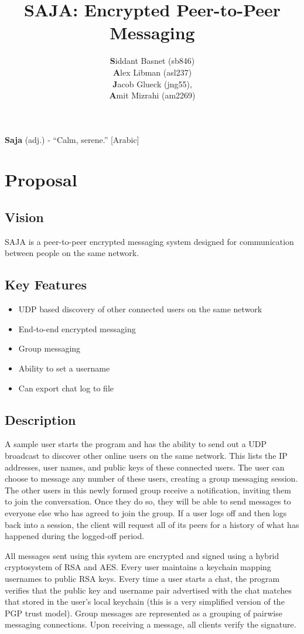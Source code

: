 \documentclass{scrartcl}
\title{SAJA: Encrypted Peer-to-Peer Messaging}
\author{\textbf{S}iddant Basnet (sb846) \\ \textbf{A}lex Libman (asl237)\\ \textbf{J}acob Glueck (jng55), \\ \textbf{A}mit Mizrahi (am2269)}
\date{}
\begin{document}
\maketitle

\textbf{Saja} (adj.) - ``Calm, serene.'' [Arabic]

\section{Proposal}
\subsection{Vision}
SAJA is a peer-to-peer encrypted messaging system designed for communication between people on the same network.

\subsection{Key Features}
\begin{itemize}
	\item UDP based discovery of other connected users on the same network
	\item End-to-end encrypted messaging
	\item Group messaging
	\item Ability to set a username
	\item Can export chat log to file
\end{itemize}

\subsection{Description}
A sample user starts the program and has the ability to send out a UDP broadcast to discover other online users on the same network. This lists the IP addresses, user names, and public keys of these connected users. The user can choose to message any number of these users, creating a group messaging session. The other users in this newly formed group receive a notification, inviting them to join the conversation. Once they do so, they will be able to send messages to everyone else who has agreed to join the group. If a user logs off and then logs back into a session, the client will request all of its peers for a history of what has happened during the logged-off period.

All messages sent using this system are encrypted and signed using a hybrid cryptosystem of RSA and AES. Every user maintains a keychain mapping usernames to public RSA keys. Every time a user starts a chat, the program verifies that the public key and username pair advertised with the chat matches that stored in the user's local keychain (this is a very simplified version of the PGP trust model). Group messages are represented as a grouping of pairwise messaging connections. Upon receiving a message, all clients verify the signature.
\end{document}
